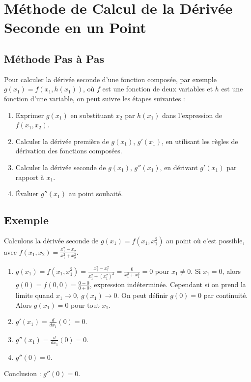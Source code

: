 \documentclass{article}
\begin{document}
\section{Méthode de Calcul de la Dérivée Seconde en un Point}

\subsection{Méthode Pas à Pas}
Pour calculer la dérivée seconde d'une fonction composée, par exemple $g(x_1) = f(x_1, h(x_1))$, où $f$ est une fonction de deux variables et $h$ est une fonction d'une variable, on peut suivre les étapes suivantes :
\begin{enumerate}
    \item Exprimer $g(x_1)$ en substituant $x_2$ par $h(x_1)$ dans l'expression de $f(x_1, x_2)$.
    \item Calculer la dérivée première de $g(x_1)$, $g'(x_1)$, en utilisant les règles de dérivation des fonctions composées.
    \item Calculer la dérivée seconde de $g(x_1)$, $g''(x_1)$, en dérivant $g'(x_1)$ par rapport à $x_1$.
    \item Évaluer $g''(x_1)$ au point souhaité.
\end{enumerate}

\subsection{Exemple}
Calculons la dérivée seconde de $g(x_1) = f(x_1, x_1^2)$ au point où c'est possible, avec $f(x_1, x_2) = \frac{x_1^2 - x_2}{x_1^2 + x_2^2}$.
\begin{enumerate}
    \item $g(x_1) = f(x_1, x_1^2) = \frac{x_1^2 - x_1^2}{x_1^2 + (x_1^2)^2} = \frac{0}{x_1^2 + x_1^4} = 0$ pour $x_1 \neq 0$. Si $x_1 = 0$, alors $g(0) = f(0, 0) = \frac{0-0}{0+0}$, expression indéterminée. Cependant si on prend la limite quand $x_1 \to 0$, $g(x_1) \to 0$. On peut définir $g(0) = 0$ par continuité. Alors $g(x_1) = 0$ pour tout $x_1$.
    \item $g'(x_1) = \frac{d}{dx_1} (0) = 0$.
    \item $g''(x_1) = \frac{d}{dx_1} (0) = 0$.
    \item $g''(0) = 0$.
\end{enumerate}
Conclusion : $g''(0) = 0$.
\end{document}
